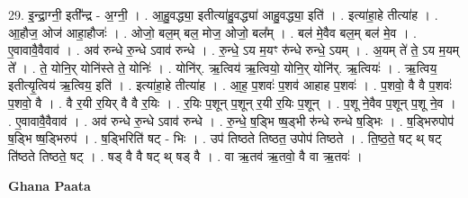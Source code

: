 \documentclass[17pt]{extarticle}
\begin{document}
29. इ॒न्द्रा॒ग्नी॒ इती᳚न्द्र - अ॒ग्नी॒ । . आ॒हु॒वद्ध्या॒ इतीत्या॑हु॒वद्ध्या॑ आहु॒वद्ध्या॒ इति॑ । . इत्या॑हा॒हे तीत्या॑ह । . आ॒हौज॒ ओज॑ आहा॒हौजः॑ । . ओजो॒ बल॒म् बल॒ मोज॒ ओजो॒ बल᳚म् । . बल॑ मे॒वैव बल॒म् बल॑ मे॒व । . ए॒वावावै॒वैवाव॑ । . अव॑ रुन्धे रु॒न्धे ऽवाव॑ रुन्धे । . रु॒न्धे॒ ऽय म॒यꣳ रु॑न्धे रुन्धे॒ ऽयम् । . अ॒यम् ते॑ ते॒ ऽय म॒यम् ते᳚ । . ते॒ योनि॒र् योनि॑स्ते ते॒ योनिः॑ । . योनि॑र्. ऋ॒त्विय॑ ऋ॒त्वियो॒ योनि॒र् योनि॑र्. ऋ॒त्वियः॑ । . ऋ॒त्विय॒ इतीत्यृ॒त्विय॑ ऋ॒त्विय॒ इति॑ । . इत्या॑हा॒हे तीत्या॑ह । . आ॒ह॒ प॒शवः॑ प॒शव॑ आहाह प॒शवः॑ । . प॒शवो॒ वै वै प॒शवः॑ प॒शवो॒ वै । . वै र॒यी र॒यिर् वै वै र॒यिः । . र॒यिः प॒शून् प॒शून् र॒यी र॒यिः प॒शून् । . प॒शू ने॒वैव प॒शून् प॒शू ने॒व । . ए॒वावावै॒वैवाव॑ । . अव॑ रुन्धे रु॒न्धे ऽवाव॑ रुन्धे । . रु॒न्धे॒ ष॒ड्भि ष्ष॒ड्भी रु॑न्धे रुन्धे ष॒ड्भिः । . ष॒ड्भिरुपोप॑ ष॒ड्भि ष्ष॒ड्भिरुप॑ । . ष॒ड्भिरिति॑ षट् - भिः । . उप॑ तिष्ठते तिष्ठत॒ उपोप॑ तिष्ठते । . ति॒ष्ठ॒ते॒ षट् थ् षट् ति॑ष्ठते तिष्ठते॒ षट् । . षड् वै वै षट् थ् षड् वै । . वा ऋ॒तव॑ ऋ॒तवो॒ वै वा ऋ॒तवः॑ । \newline

\textbf{Ghana Paata } \newline
\end{document}
